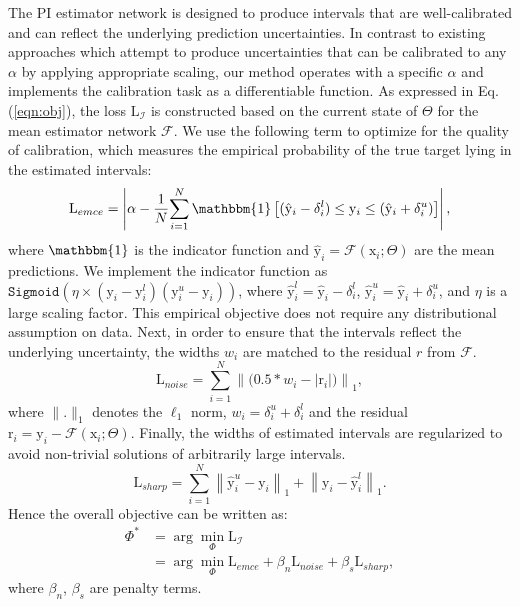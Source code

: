 \documentclass[letterpaper]{article} %
\newcommand\norm[1]{\left\lVert#1\right\rVert}
\begin{document}
The PI estimator network is designed to produce intervals that are well-calibrated and can reflect the underlying prediction uncertainties. In contrast to existing approaches which attempt to produce uncertainties that can be calibrated to any $\alpha$ by applying appropriate scaling, our method operates with a specific $\alpha$ and implements the calibration task as a differentiable function. As expressed in Eq. (\ref{eqn:obj}), the loss $\mathrm{L}_{\mathcal{I}}$ is constructed based on the current state of $\Theta$ for the mean estimator network $\mathcal{F}$. We use the following term to optimize for the quality of calibration, which measures the empirical probability of the true target lying in the estimated intervals:
\small
\begin{equation} \label{eqn:emce}
\mathrm{L}_{emce} =  \left|\alpha - \frac{1}{N}{ \displaystyle \sum_{i=1}^{N}\mathbbm{1}\left[(\hat{\mathrm{y}}_{i}-\delta_i^l) \leq \mathrm{y}_i \leq (\hat{\mathrm{y}}_{i}+\delta_i^u)\right]} \right|,
\end{equation}\normalsize where $\mathbbm{1}$ is the indicator function and $\hat{\mathrm{y}}_i = \mathcal{F}(\mathrm{x}_i; \Theta)$ are the mean predictions. We implement the indicator function as $\texttt{Sigmoid}(\eta \times (\mathrm{y}_i - \mathrm{y}_i^l)(\mathrm{y}_i^u - \mathrm{y}_i))$, where $\hat{\mathrm{y}}_i^l = \hat{\mathrm{y}}_i - \delta_i^l$, $\hat{\mathrm{y}}_i^u = \hat{\mathrm{y}}_i + \delta_i^u$, and $\eta$ is a large scaling factor. This empirical objective does not require any distributional assumption on data.  Next, in order to ensure that the intervals reflect the underlying uncertainty, the widths $w_i$ are matched to the residual $r$ from $\mathcal{F}$.
\begin{equation} \label{eqn:noise}
 \mathrm{L}_{noise}= \sum_{i=1}^N \norm{ \biggl(0.5 * w_i - |\mathrm{r}_i| \biggr)}_1,
\end{equation}where $\|.\|_1$ denotes the $\ell_1$ norm, $w_i = \delta^u_i + \delta^l_i$ and the residual $\mathrm{r}_i = \mathrm{y}_i - \mathcal{F}(\mathrm{x}_i; \Theta)$. Finally, the widths of estimated intervals are regularized to avoid non-trivial solutions of arbitrarily large intervals.
\begin{equation} \label{eqn:sharp}
 \mathrm{L}_{sharp} =  \sum_{i=1}^N \norm{\hat{\mathrm{y}}_i^u-\mathrm{y}_i}_1 +\norm{\mathrm{y}_i-\hat{\mathrm{y}}_i^l}_1.
\end{equation}Hence the overall objective can be written as:
\begin{align} \label{eqn:conf esti}
\nonumber \Phi^* &= \arg \min_{\Phi} \mathrm{L}_{\mathcal{I}} \\
&= \arg \min_{\Phi} \mathrm{L}_{emce} + \beta_n \mathrm{L}_{noise} + \beta_s \mathrm{L}_{sharp},
\end{align}where $\beta_n$, $\beta_s$ are penalty terms.
\end{document}
